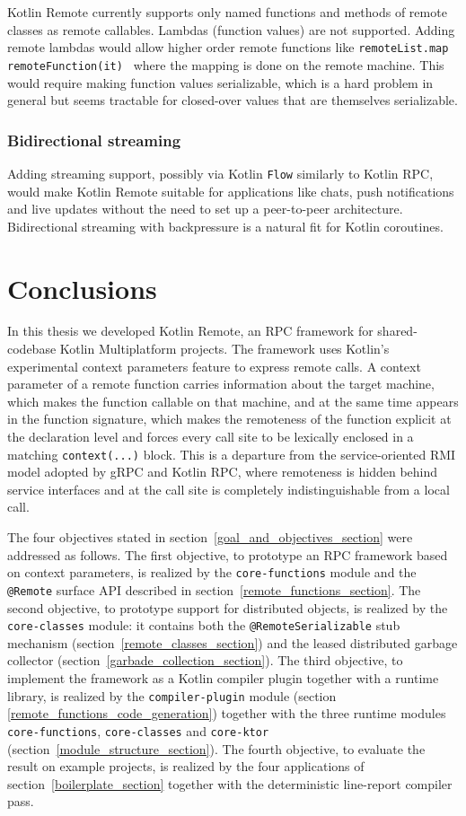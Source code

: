 \documentclass[a4paper,11pt,oneside]{article}
\newcommand{\kotlini}[1]{\texttt{#1}}
\newcommand{\ki}[1]{\kotlini{#1}}
\begin{document}
Kotlin Remote currently supports only named functions and methods of remote classes as remote
callables. Lambdas (function values) are not supported. Adding remote lambdas would allow higher
order remote functions like \kotlini{remoteList.map { remoteFunction(it) }} where the mapping is done
on the remote machine. This would require making function values serializable, which is a hard
problem in general but seems tractable for closed-over values that are themselves serializable.

\subsubsection{Bidirectional streaming}

Adding streaming support, possibly via Kotlin \kotlini{Flow} similarly to Kotlin RPC, would
make Kotlin Remote suitable for applications like chats, push notifications and live updates
without the need to set up a peer-to-peer architecture. Bidirectional streaming with backpressure is a
natural fit for Kotlin coroutines.

\section{Conclusions}

In this thesis we developed Kotlin Remote, an RPC framework for shared-codebase Kotlin
Multiplatform projects. The framework uses Kotlin's experimental context parameters feature
to express remote calls. A context parameter of a remote function carries information about
the target machine, which makes the function callable on that machine, and at the same time
appears in the function signature, which makes the remoteness of the function explicit at the
declaration level and forces every call site to be lexically enclosed in a matching
\kotlini{context(...)} block. This is a departure from the service-oriented RMI model adopted
by gRPC and Kotlin RPC, where remoteness is hidden behind service interfaces and at the call
site is completely indistinguishable from a local call.

The four objectives stated in section~\ref{goal_and_objectives_section} were addressed as
follows. The first objective, to prototype an RPC framework based on context parameters, is
realized by the \ki{core-functions} module and the \kotlini{@Remote} surface API described in
section~\ref{remote_functions_section}. The second objective, to prototype support for
distributed objects, is realized by the \ki{core-classes} module: it contains both the
\kotlini{@RemoteSerializable} stub mechanism (section~\ref{remote_classes_section}) and the
leased distributed garbage collector (section~\ref{garbade_collection_section}). The third
objective, to implement the framework as a Kotlin compiler plugin together with a runtime
library, is realized by the \ki{compiler-plugin} module (section
\ref{remote_functions_code_generation}) together with the three runtime modules
\ki{core-functions}, \ki{core-classes} and \ki{core-ktor}
(section~\ref{module_structure_section}). The fourth objective, to evaluate the result on
example projects, is realized by the four applications of section~\ref{boilerplate_section}
together with the deterministic line-report compiler pass.
\end{document}
